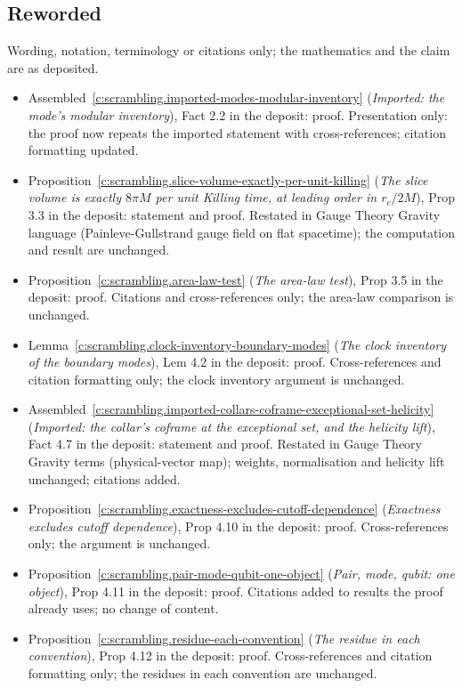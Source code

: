 \documentclass[11pt]{article}
\theoremstyle{definition}
\theoremstyle{plain}
\begin{document}
\subsection*{Reworded}
Wording, notation, terminology or citations only; the mathematics and the claim are as deposited.
\begin{itemize}\setlength{\itemsep}{2pt}
\item Assembled~\ref{c:scrambling.imported-modes-modular-inventory} (\emph{Imported: the mode's modular inventory}), Fact 2.2 in the deposit: proof. Presentation only: the proof now repeats the imported statement with cross-references; citation formatting updated.
\item Proposition~\ref{c:scrambling.slice-volume-exactly-per-unit-killing} (\emph{The slice volume is exactly $8\pi M$ per unit Killing time, at leading order in $r_c/2M$}), Prop 3.3 in the deposit: statement and proof. Restated in Gauge Theory Gravity language (Painleve-Gullstrand gauge field on flat spacetime); the computation and result are unchanged.
\item Proposition~\ref{c:scrambling.area-law-test} (\emph{The area-law test}), Prop 3.5 in the deposit: proof. Citations and cross-references only; the area-law comparison is unchanged.
\item Lemma~\ref{c:scrambling.clock-inventory-boundary-modes} (\emph{The clock inventory of the boundary modes}), Lem 4.2 in the deposit: proof. Cross-references and citation formatting only; the clock inventory argument is unchanged.
\item Assembled~\ref{c:scrambling.imported-collars-coframe-exceptional-set-helicity} (\emph{Imported: the collar's coframe at the exceptional set, and the helicity lift}), Fact 4.7 in the deposit: statement and proof. Restated in Gauge Theory Gravity terms (physical-vector map); weights, normalisation and helicity lift unchanged; citations added.
\item Proposition~\ref{c:scrambling.exactness-excludes-cutoff-dependence} (\emph{Exactness excludes cutoff dependence}), Prop 4.10 in the deposit: proof. Cross-references only; the argument is unchanged.
\item Proposition~\ref{c:scrambling.pair-mode-qubit-one-object} (\emph{Pair, mode, qubit: one object}), Prop 4.11 in the deposit: proof. Citations added to results the proof already uses; no change of content.
\item Proposition~\ref{c:scrambling.residue-each-convention} (\emph{The residue in each convention}), Prop 4.12 in the deposit: proof. Cross-references and citation formatting only; the residues in each convention are unchanged.

\end{itemize}
\end{document}
